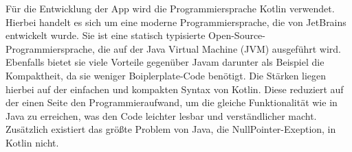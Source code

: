 \noindent
Für die Entwicklung der App wird die Programmiersprache Kotlin verwendet. Hierbei handelt es sich um eine moderne Programmiersprache, die von JetBrains entwickelt wurde. Sie ist eine statisch typisierte Open-Source-Programmiersprache, die auf der Java Virtual Machine (JVM) ausgeführt wird. Ebenfalls bietet sie viele Vorteile gegenüber Javam darunter als Beispiel die Kompaktheit, da sie weniger Boiplerplate-Code benötigt. Die Stärken liegen hierbei auf der einfachen und kompakten Syntax von Kotlin. Diese reduziert auf der einen Seite den Programmieraufwand, um die gleiche Funktionalität wie in Java zu erreichen, was den Code leichter lesbar und verständlicher macht. Zusätzlich existiert das größte Problem von Java, die NullPointer-Exeption, in Kotlin nicht. \cite {bollhoff_kotlin_2022}
